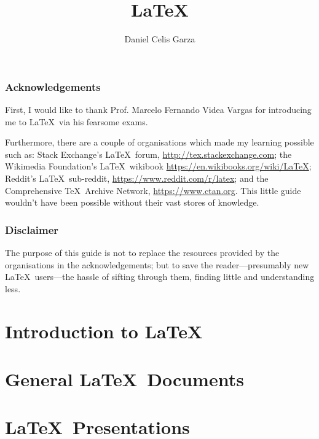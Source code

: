 \documentclass[12pt]{report}
\title{\LaTeX}[Quick-Start Guide]
\author{Daniel Celis Garza}
\begin{document}
\frontmatter
\maketitle

\section{Acknowledgements}
First, I would like to thank Prof. Marcelo Fernando Videa Vargas for
introducing me to \LaTeX~via his fearsome exams.

Furthermore, there are a couple of organisations which made my
learning possible such as: Stack Exchange's \LaTeX~forum,
\url{http://tex.stackexchange.com}; the Wikimedia Foundation's
\LaTeX~wikibook \url{https://en.wikibooks.org/wiki/LaTeX}; Reddit's
\LaTeX~sub-reddit, \url{https://www.reddit.com/r/latex}; and the
Comprehensive \TeX~Archive Network, \url{https://www.ctan.org}.  This
little guide wouldn't have been possible without their vast stores of
knowledge.

\section{Disclaimer}
The purpose of this guide is not to replace the resources provided by
the organisations in the acknowledgements; but to save the
reader---presumably new \LaTeX~users---the hassle of sifting through
them, finding little and understanding less.

\clearpage
\tableofcontents
\listoftables
\listoffigures

\mainmatter

\part{Introduction to \LaTeX}



\part{General \LaTeX~Documents}






\part{\LaTeX~Presentations}



\backmatter



\end{document}
